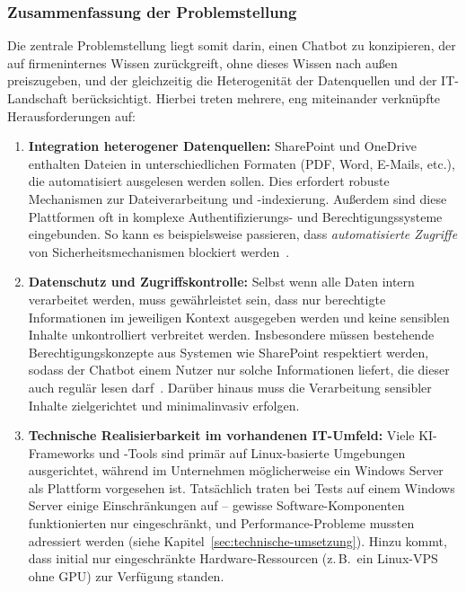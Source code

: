 \subsubsection{Zusammenfassung der Problemstellung}

Die zentrale Problemstellung liegt somit darin, einen Chatbot zu konzipieren, der auf firmeninternes Wissen zurückgreift, ohne dieses Wissen nach außen preiszugeben, und der gleichzeitig die Heterogenität der Datenquellen und der IT-Landschaft berücksichtigt.
Hierbei treten mehrere, eng miteinander verknüpfte Herausforderungen auf:

\begin{enumerate}
    \item \textbf{Integration heterogener Datenquellen:}
    SharePoint und OneDrive enthalten Dateien in unterschiedlichen Formaten (PDF, Word, E-Mails, etc.), die automatisiert ausgelesen werden sollen.
    Dies erfordert robuste Mechanismen zur Dateiverarbeitung und -indexierung.
    Außerdem sind diese Plattformen oft in komplexe Authentifizierungs- und Berechtigungssysteme eingebunden.
    So kann es beispielsweise passieren, dass \textit{automatisierte Zugriffe} von Sicherheitsmechanismen blockiert werden~\cite{airom2024rag_enterprise}.

    \item \textbf{Datenschutz und Zugriffskontrolle:}
    Selbst wenn alle Daten intern verarbeitet werden, muss gewährleistet sein, dass nur berechtigte Informationen im jeweiligen Kontext ausgegeben werden und keine sensiblen Inhalte unkontrolliert verbreitet werden.
    Insbesondere müssen bestehende Berechtigungskonzepte aus Systemen wie SharePoint respektiert werden, sodass der Chatbot einem Nutzer nur solche Informationen liefert, die dieser auch regulär lesen darf~\cite{realmlabs_secure_rag}.
    Darüber hinaus muss die Verarbeitung sensibler Inhalte zielgerichtet und minimalinvasiv erfolgen.

    \item \textbf{Technische Realisierbarkeit im vorhandenen IT-Umfeld:}
    Viele KI-Frameworks und -Tools sind primär auf Linux-basierte Umgebungen ausgerichtet, während im Unternehmen möglicherweise ein Windows Server als Plattform vorgesehen ist.
    Tatsächlich traten bei Tests auf einem Windows Server einige Einschränkungen auf – gewisse Software-Komponenten funktionierten nur eingeschränkt, und Performance-Probleme mussten adressiert werden (siehe Kapitel~\ref{sec:technische-umsetzung}).
    Hinzu kommt, dass initial nur eingeschränkte Hardware-Ressourcen (z.\,B.\ ein Linux-VPS ohne GPU) zur Verfügung standen.
\end{enumerate}

